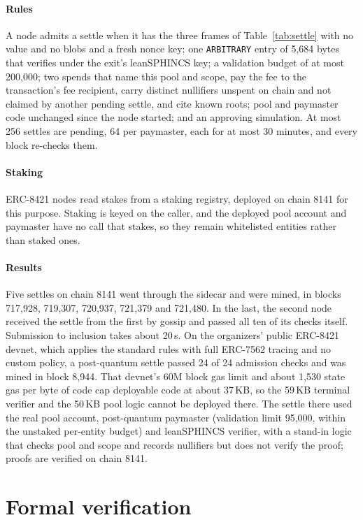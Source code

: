 \documentclass[11pt,a4paper]{article}
\newcommand{\code}[1]{\texttt{\small #1}}
\begin{document}
\paragraph{Rules} A node admits a settle when it has the three frames of Table~\ref{tab:settle} with no
value and no blobs and a fresh nonce key; one \code{ARBITRARY} entry of 5,684 bytes that verifies under the
exit's leanSPHINCS key; a validation budget of at most 200,000; two spends that name this pool and scope,
pay the fee to the transaction's fee recipient, carry distinct nullifiers unspent on chain and not claimed
by another pending settle, and cite known roots; pool and paymaster code unchanged since the node started;
and an approving simulation. At most 256 settles are pending, 64 per paymaster, each for at most
30 minutes, and every block re-checks them.

\paragraph{Staking} ERC-8421 nodes read stakes from a staking registry, deployed on chain 8141 for this
purpose. Staking is keyed on the caller, and the deployed pool account and paymaster have no call that
stakes, so they remain whitelisted entities rather than staked ones.

\paragraph{Results} Five settles on chain 8141 went through the sidecar and were mined, in blocks 717,928,
719,307, 720,937, 721,379 and 721,480. In the last, the second node received the settle from the first by
gossip and passed all ten of its checks itself. Submission to inclusion takes about 20\,s. On the
organizers' public ERC-8421 devnet, which applies the standard rules with full ERC-7562 tracing and no
custom policy, a post-quantum settle passed 24 of 24 admission checks and was mined in block 8,944. That
devnet's 60M block gas limit and about 1,530 state gas per byte of code cap deployable code at about
37\,KB, so the 59\,KB terminal verifier and the 50\,KB pool logic cannot be deployed there. The settle
there used the real pool account, post-quantum paymaster (validation limit 95,000, within the unstaked
per-entity budget) and leanSPHINCS verifier, with a stand-in logic that checks pool and scope and records
nullifiers but does not verify the proof; proofs are verified on chain 8141.

\section{Formal verification}
\end{document}

